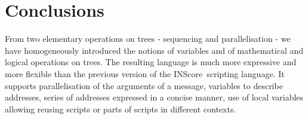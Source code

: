 \documentclass[runningheads,a4paper]{llncs}
\newcommand{\IS}		{INScore}
\begin{document}
\section{Conclusions}
From two elementary operations on trees - sequencing and parallelisation - we have homogeneously introduced the notions of variables and of mathematical and logical operations on trees. The resulting language is much more expressive and more flexible than the  previous version of the \IS\ scripting language. 
It supports parallelisation of the arguments of a message, variables to describe addresses, series of addresses expressed in a concise manner, use of local variables allowing reusing scripts or parts of scripts in different contexts.




\end{document}
